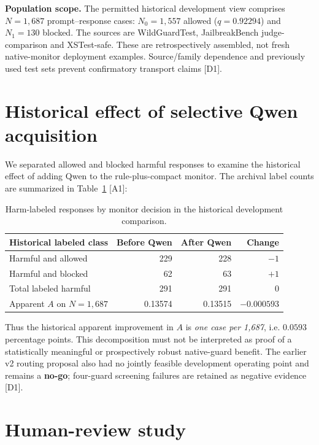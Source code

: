 \documentclass[11pt,a4paper]{article}
\begin{document}
\textbf{Population scope.} The permitted historical development view comprises $N=1{,}687$ prompt--response cases: $N_0=1{,}557$ allowed ($q=0.92294$) and $N_1=130$ blocked. The sources are WildGuardTest, JailbreakBench judge-comparison and XSTest-safe. These are retrospectively assembled, not fresh native-monitor deployment examples. Source/family dependence and previously used test sets prevent confirmatory transport claims [D1].

\section{Historical effect of selective Qwen acquisition}
We separated allowed and blocked harmful responses to examine the historical effect of adding Qwen to the rule-plus-compact monitor. The archival label counts are summarized in Table~\ref{tab:qwen} [A1]:
\begin{table}[H]\centering
\caption{Harm-labeled responses by monitor decision in the historical development comparison.}\label{tab:qwen}
\begin{tabular}{@{}lrrr@{}}\toprule
Historical labeled class & Before Qwen & After Qwen & Change\\\midrule
Harmful and allowed & 229 & 228 & $-1$\\
Harmful and blocked & 62 & 63 & $+1$\\
Total labeled harmful & 291 & 291 & $0$\\\midrule
Apparent $A$ on $N=1{,}687$ & 0.13574 & 0.13515 & $-0.000593$\\\bottomrule
\end{tabular}
\end{table}
Thus the historical apparent improvement in $A$ is \emph{one case per 1,687}, i.e. $0.0593$ percentage points. This decomposition must not be interpreted as proof of a statistically meaningful or prospectively robust native-guard benefit. The earlier v2 routing proposal also had no jointly feasible development operating point and remains a \textbf{no-go}; four-guard screening failures are retained as negative evidence [D1].

\section{Human-review study}
\end{document}
